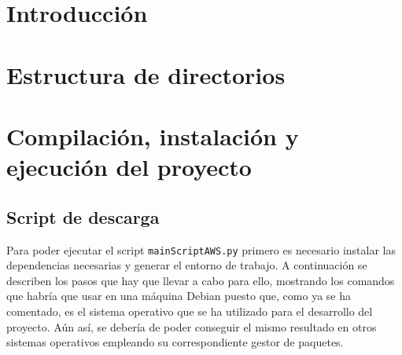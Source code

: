 
\section{Introducción}

\section{Estructura de directorios}


\section{Compilación, instalación y ejecución del proyecto}

\subsection{Script de descarga}

Para poder ejecutar el script \texttt{mainScriptAWS.py} primero es necesario instalar las dependencias necesarias y generar el entorno de trabajo. A continuación se describen los pasos que hay que llevar a cabo para ello, mostrando los comandos que habría que usar en una máquina Debian puesto que, como ya se ha comentado, es el sistema operativo que se ha utilizado para el desarrollo del proyecto. Aún así, se debería de poder conseguir el mismo resultado en otros sistemas operativos empleando su correspondiente gestor de paquetes.

